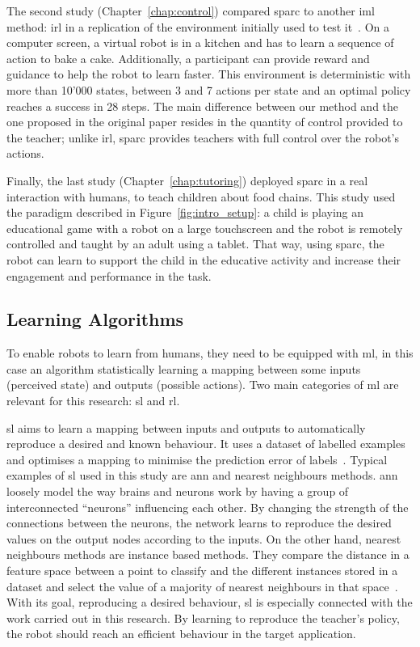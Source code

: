 The second study (Chapter~\ref{chap:control}) compared \gls{sparc} to another \gls{iml} method: \gls{irl} in a replication of the environment initially used to test it~\citep{thomaz2008teachable}. On a computer screen, a virtual robot is in a kitchen and has to learn a sequence of action to bake a cake. Additionally, a participant can provide reward and guidance to help the robot to learn faster. This environment is deterministic with more than 10'000 states, between 3 and 7 actions per state and an optimal policy reaches a success in 28 steps. The main difference between our method and the one proposed in the original paper resides in the quantity of control provided to the teacher; unlike \gls{irl}, \gls{sparc} provides teachers with full control over the robot's actions. 

Finally, the last study (Chapter~\ref{chap:tutoring}) deployed \gls{sparc} in a real interaction with humans, to teach children about food chains. This study used the paradigm described in Figure~\ref{fig:intro_setup}: a child is playing an educational game with a robot on a large touchscreen and the robot is remotely controlled and taught by an adult using a tablet. That way, using \gls{sparc}, the robot can learn to support the child in the educative activity and increase their engagement and performance in the task.

\subsection{Learning Algorithms}

To enable robots to learn from humans, they need to be equipped with \acrfull{ml}, in this case an algorithm statistically learning a mapping between some inputs (perceived state) and outputs (possible actions). Two main categories of \gls{ml} are relevant for this research: \gls{sl} and \gls{rl}.

\gls{sl} aims to learn a mapping between inputs and outputs to automatically reproduce a desired and known behaviour. It uses a dataset of labelled examples and optimises a mapping to minimise the prediction error of labels~\citep{russell2016artificial}. Typical examples of \gls{sl} used in this study are \gls{ann} and nearest neighbours methods. \gls{ann} loosely model the way brains and neurons work by having a group of interconnected ``neurons'' influencing each other. By changing the strength of the connections between the neurons, the network learns to reproduce the desired values on the output nodes according to the inputs. On the other hand, nearest neighbours methods are instance based methods. They compare the distance in a feature space between a point to classify and the different instances stored in a dataset and select the value of a majority of nearest neighbours in that space~\citep{cover1967nearest}. With its goal, reproducing a desired behaviour, \gls{sl} is especially connected with the work carried out in this research. By learning to reproduce the teacher's policy, the robot should reach an efficient behaviour in the target application.


